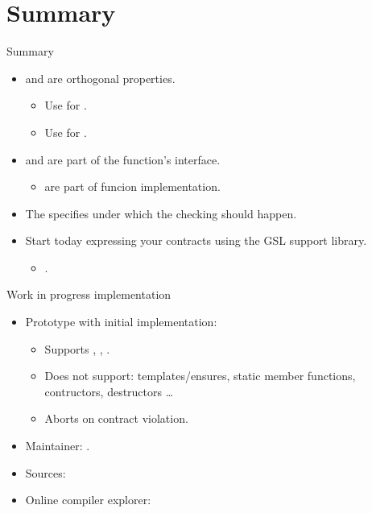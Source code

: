 \section{Summary}

\begin{frame}[t]{Summary}
\begin{itemize}
  \item {} and  are orthogonal properties.
    \begin{itemize}
      \item Use  for .
      \item Use  for .
    \end{itemize}

  \vfill\pause
  \item {} and  are part of the
        function's interface.
    \begin{itemize}
      \item {} are part of funcion implementation.
    \end{itemize}

  \vfill\pause
  \item The  specifies under which 
        the checking should happen.

  \vfill\pause
  \item Start today expressing your contracts using the GSL support library.
    \begin{itemize}
      \item {}.
    \end{itemize}
\end{itemize}
\end{frame}

\begin{frame}[t]{Work in progress implementation}
\begin{itemize}
  \item Prototype with initial implementation:
    \begin{itemize}
      \item Supports , , .
      \item Does not support: templates/ensures, static member functions, contructors, destructors \ldots
      \item Aborts on contract violation.
    \end{itemize}
  \vfill
  \item Maintainer: .
  \vfill
  \item Sources:
\end{itemize}
  \vfill
\begin{itemize}
  \item Online compiler explorer:
\end{itemize}
\end{frame}
